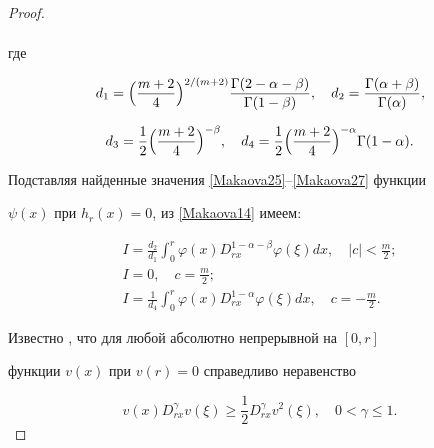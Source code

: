 \begin{proof}
\begin{gather}
 \end{gather}

 где

\[d_1=\Bigl( \frac{m+2}{4} \Bigr)^{{2}/({m+2}) } \frac{\Gamma(2-\alpha-\beta)}{\Gamma(1-\beta)} , \quad 

d_2=\frac{\Gamma(\alpha+\beta)}{\Gamma(\alpha)} ,

\]

\[

d_3=\frac{1}{2} \Bigl( \frac{m+2}{4} \Bigr)^{-\beta } , \quad 

d_4=\frac{1}{2} \Bigl( \frac{m+2}{4} \Bigr)^{-\alpha } \Gamma(1-\alpha).

\]

Подставляя найденные значения  \eqref{Makaova25}--\eqref{Makaova27} функции 

$\psi(x)$  при $h_r(x)=0$, из \eqref{Makaova14} имеем:



\begin{gather}

\label{Makaova28} 

I=\frac{d_2}{d_1} \int _0^r \varphi(x) 

D^{1-\alpha-\beta}_{rx} \varphi(\xi) dx, \quad 

 |c|<\frac{m}{2};

\\

\label{Makaova29} 

I= 0,  \quad c=\frac{m}{2};

\\

\label{Makaova30} 

I=\frac{1}{d_4} \int _0^r \varphi(x)

   D^{1-\alpha}_{rx} \varphi(\xi) dx,    \quad  c=-\frac{m}{2}.

 \end{gather}

 

Известно \cite{Balkizov_24}, что для любой абсолютно непрерывной на  $[0,r]$ 

функции $v(x)$ при $v(r)=0$ справедливо неравенство 

 \begin{equation}

\label{Makaova31}  v(x)D_{rx}^\gamma v(\xi) \geq \frac{1}{2}D_{rx}^\gamma v^2(\xi), \quad  0<\gamma \leq 1.

 \end{equation}


\end{proof}
